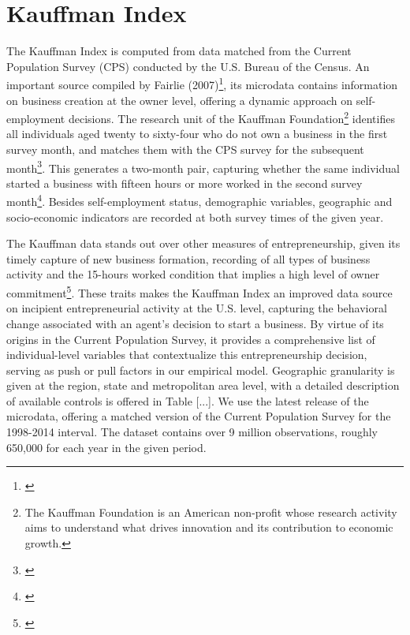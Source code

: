 \section{Kauffman Index}
The Kauffman Index is computed from data matched from the Current Population Survey (CPS) conducted by the U.S. Bureau of the Census. An important source compiled by Fairlie (2007)\footnote{\cite{Fairlie2007}}, its microdata contains information on business creation at the owner level, offering a dynamic approach on self-employment decisions. The research unit of the Kauffman Foundation\footnote{The Kauffman Foundation is an American non-profit whose research activity aims to understand what drives innovation and its contribution to economic growth. } identifies all individuals aged twenty to sixty-four who do not own a business in the first survey month, and matches them with the CPS survey for the subsequent month\footnote{\cite{Fairlie2007}}. This generates a two-month pair, capturing whether the same individual started a business with fifteen hours or more worked in the second survey month\footnote{\cite{Fairlie2007}}. Besides self-employment status, demographic variables, geographic and socio-economic indicators are recorded at both survey times of the given year. 

The Kauffman data stands out over other measures of entrepreneurship, given its timely capture of new business formation, recording of all types of business activity and the 15-hours worked condition that implies a high level of owner commitment\footnote{\cite{Fairlie2007}}. These traits makes the Kauffman Index an improved data source on incipient entrepreneurial activity at the U.S. level, capturing the behavioral change associated with an agent’s decision to start a business. By virtue of its origins in the Current Population Survey, it provides a comprehensive list of individual-level variables that contextualize this entrepreneurship decision, serving as push or pull factors in our empirical model. Geographic granularity is given at the region, state and metropolitan area level, with a detailed description of available controls is offered in Table [...]. We use the latest release of the microdata, offering a matched version of the Current Population Survey for the 1998-2014 interval. The dataset contains over 9 million observations, roughly 650,000 for each year in the given period.

